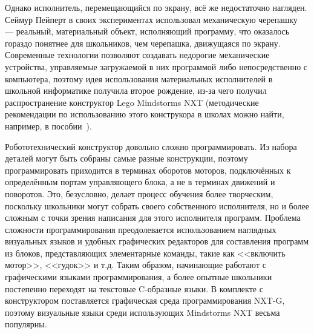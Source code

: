 \documentclass[a4paper]{article}
\begin{document}
Однако исполнитель, перемещающийся по экрану, всё же недостаточно нагляден. Сеймур Пейперт в своих экспериментах использовал механическую черепашку~\cite{logoTurtle} --- реальный, материальный объект, исполняющий программу, что оказалось гораздо понятнее для школьников, чем черепашка, движущаяся по экрану. Современные технологии позволяют создавать недорогие механические устройства, управляемые загружаемой в них программой либо непосредственно с компьютера, поэтому идея использования материальных исполнителей в школьной информатике получила второе рождение, из-за чего получил распространение конструктор Lego Mindstorms NXT (методические рекомендации по использованию этого конструкора в школах можно найти, например, в пособии~\cite{filippov}). 

Робототехнический конструктор довольно сложно программировать. Из набора деталей могут быть собраны самые разные конструкции, поэтому программировать приходится в терминах оборотов моторов, подключённых к определённым портам управляющего блока, а не в терминах движений и поворотов. Это, безусловно, делает процесс обучения более творческим, поскольку школьники могут собрать своего собственного исполнителя, но и более сложным с точки зрения написания для этого исполнителя программ. Проблема сложности программирования преодолевается использованием наглядных визуальных языков и удобных графических редакторов для составления программ из блоков, представляющих элементарные команды, такие как <<включить мотор>>, <<гудок>> и т.д. Таким образом, начинающие работают с графическими языками программирования, а более опытные школьники постепенно переходят на текстовые C-образные языки. В комплекте с конструктором поставляется графическая среда программирования NXT-G, поэтому визуальные языки среди использующих Mindstorms NXT весьма популярны.
\end{document}
